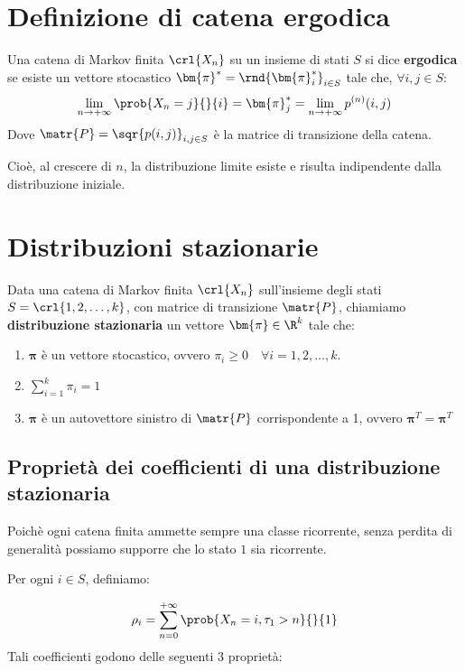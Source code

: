 \documentclass[\main/main.tex]{subfiles}
\begin{document}
\section{Definizione di catena ergodica}
\begin{definition}
	Una catena di Markov finita \(\crl{X_n}\) su un insieme di stati \(S\) si dice \textbf{ergodica} se esiste un vettore stocastico \(\bm{\pi}^* = \rnd{\bm{\pi}_i^*}_{i \in S}\) tale che, \(\forall i,j \in S\):
	\[
		\lim_{n\rightarrow+\infty} \prob{X_n = j}{}{i} = \bm{\pi}_j^* = \lim_{n \rightarrow + \infty} p^{(n)} (i,j)
	\]
	Dove \(\matr{P} = \sqr{p(i,j)}_{i,j \in S}\) è la matrice di transizione della catena.

	Cioè, al crescere di \(n\), la distribuzione limite esiste e risulta indipendente dalla distribuzione iniziale.
\end{definition}

\section{Distribuzioni stazionarie}
\begin{definition}
	Data una catena di Markov finita \(\crl{X_n}\) sull'insieme degli stati \(S = \crl{1,2, \ldots, k}\), con matrice di transizione \(\matr{P}\), chiamiamo \textbf{distribuzione stazionaria} un vettore \(\bm{\pi} \in \R^k\) tale che:
	\begin{enumerate}
		\item \(\bm{\pi}\) è un vettore stocastico, ovvero \(\pi_i \geq 0 \quad \forall i = 1,2,\ldots, k\).
		\item \(\sum_{i=1}^k \pi_i = 1\)
		\item \(\bm{\pi}\) è un autovettore sinistro di \(\matr{P}\) corrispondente a 1, ovvero \(\bm{\pi}^T = \bm{\pi}^T\)
	\end{enumerate}
\end{definition}

\subsection{Proprietà dei coefficienti di una distribuzione stazionaria}
Poichè ogni catena finita ammette sempre una classe ricorrente, senza perdita di generalità possiamo supporre che lo stato \(1\) sia ricorrente.

Per ogni \(i \in S\), definiamo:

\[
	\rho_i = \sum_{n=0}^{+\infty} \prob{X_n = i, \tau_1 > n}{}{1}
\]
Tali coefficienti godono delle seguenti 3 proprietà:
\end{document}
